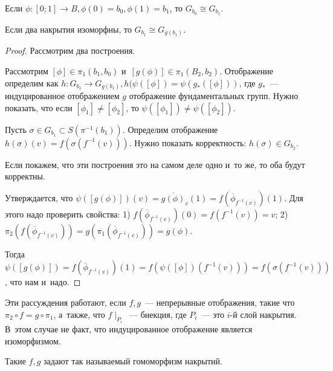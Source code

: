 \documentclass{article}
\begin{document}
\begin{remark}
	Если $\phi: [0; 1] \rightarrow B, \phi(0) = b_0, \phi(1) = b_1$, то $G_{b_0}
	\cong G_{b_1}$.
\end{remark}
\begin{remark}
	Если два накрытия изоморфны, то $G_{b_1} \cong G_{g(b_1)}$.
\end{remark}
\begin{proof}
	Рассмотрим два построения.

	Рассмотрим $[\phi] \in \pi_1(b_1, b_0)$ и~$[g(\phi)] \in \pi_1(B_2, b_2)$.
	Отображение определим как	$h: G_{b_1} \rightarrow G_{g(b_1)}, h(\psi([\phi]) =
	\psi(g_\ast([\phi]))$, где $g_\ast$~--- индуцированное отображением $g$
	отображение фундаментальных групп. Нужно показать, что если $[\phi_1] \ne
	[\phi_2]$, то $\psi([\phi_1]) \ne \psi([\phi_2])$.

	Пусть $\sigma \in G_{b_1} \subset S(\pi^{-1}(b_1))$. Определим отображение
	$h(\sigma)(v) = f(\sigma(f^{-1}(v)))$. Нужно показать корректность: $h(\sigma)
	\in G_{b_2}$.

	Если покажем, что эти построения это на самом деле одно и~то же, то оба будут
	корректны.

	Утверждается, что $\psi([g(\phi)])(v) = \overline{g(\phi)}_v(1) =
	f(\overline\phi_{f^{-1}(v)})(1)$. Для этого надо проверить свойства:
	1) $f(\overline\phi_{f^{-1}(v)})(0) = f(f^{-1}(v)) = v$; 2)
	$\pi_2(f(\overline\phi_{f^{-1}(v)})) = g(\pi_1(\overline\phi_{f^{-1}(v)})) =
	g(\phi)$.

	Тогда $\psi([g(\phi)]) = f(\overline\phi_{f^{-1}(v)})(1) =
	f(\psi([\phi])(f^{-1}(v))) = f(\sigma(f^{-1}(v)))$, что нам и~надо.
\end{proof}
\begin{remark}
	Эти рассуждения работают, если $f, g$~--- непрерывные отображения, такие что
	$\pi_2 \circ f = g \circ \pi_1$, а~также, что $f\mid_{P_i}$~--- биекция, где
	$P_i$~--- это $i$-й слой накрытия. В~этом случае не факт, что индуцированное
	отображение является изоморфизмом.

	Такие $f, g$ задают так называемый гомоморфизм накрытий.
\end{remark}
\end{document}

